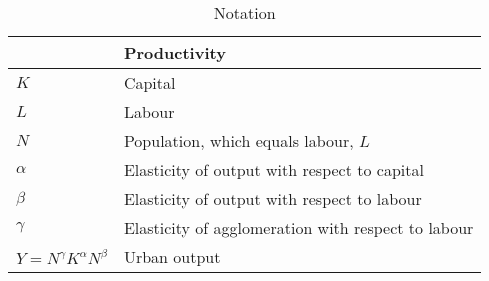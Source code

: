 \newpage
\begin{longtable}{lp{10cm}}
\caption{Notation}                       \\

\hline           &  \textbf{Productivity} \\ \hline
$K$              &  Capital               \\ 
$L$              &  Labour                \\
$N$              &  Population, which equals labour, $L$                  \\ 
$\alpha$         &  Elasticity of output with respect to capital          \\
$\beta$          &  Elasticity of output with respect to labour           \\ %
$\gamma$         &  Elasticity of agglomeration with respect to labour    \\ %
$Y=N^\gamma K^{\alpha }N^{\beta }$  &  Urban output                       \\


\end{longtable}

